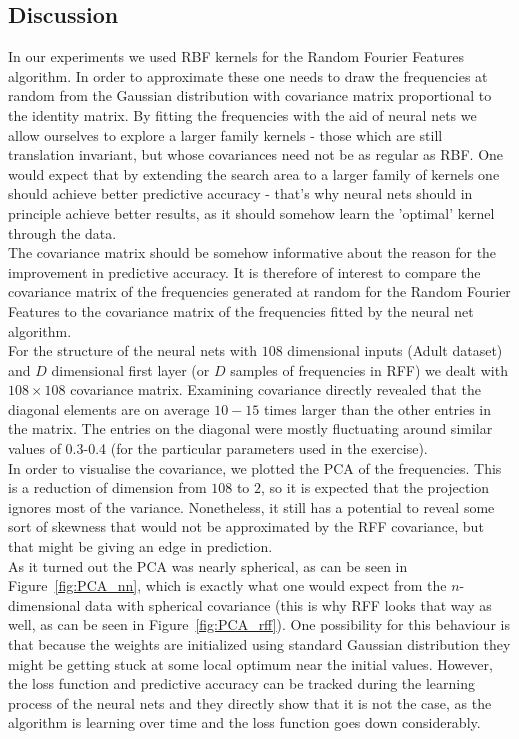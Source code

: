 \documentclass{article} %
\begin{document}
\subsection{Discussion}
In our experiments we used RBF kernels for the Random Fourier Features algorithm. In order to approximate these one needs to draw the frequencies at random from the Gaussian distribution with covariance matrix proportional to the identity matrix. By fitting the frequencies with the aid of neural nets we allow ourselves to explore a larger family kernels - those which are still translation invariant, but whose covariances need not be as regular as RBF. One would expect that by extending the search area to a larger family of kernels one should achieve better predictive accuracy - that's why neural nets should in principle achieve better results, as it should somehow learn the 'optimal' kernel through the data.\\

The covariance matrix should be somehow informative about the reason for the improvement in predictive accuracy. It is therefore of interest to compare the covariance matrix of the frequencies generated at random for the Random Fourier Features to the covariance matrix of the frequencies fitted by the neural net algorithm.\\

For the structure of the neural nets with $108$ dimensional inputs (Adult dataset) and $D$ dimensional first layer (or $D$ samples of frequencies in RFF) we dealt with $108\times 108$ covariance matrix. Examining covariance directly revealed that the diagonal elements are on average $10-15$ times larger than the other entries in the matrix. The entries on the diagonal were mostly fluctuating around similar values of 0.3-0.4 (for the particular parameters used in the exercise).\\

In order to visualise the covariance, we plotted the PCA of the frequencies. This is a reduction of dimension from $108$ to $2$, so it is expected that the projection ignores most of the variance. Nonetheless, it still has a potential to reveal some sort of skewness that would not be approximated by the RFF covariance, but that might be giving an edge in prediction.\\

As it turned out the PCA was nearly spherical, as can be seen in Figure~\ref{fig:PCA_nn}, which is exactly what one would expect from the $n$-dimensional data with spherical covariance (this is why RFF looks that way as well, as can be seen in Figure~\ref{fig:PCA_rff}). One possibility for this behaviour is that because the weights are initialized using standard Gaussian distribution they might be getting stuck at some local optimum near the initial values. However, the loss function and predictive accuracy can be tracked during the learning process of the neural nets and they directly show that it is not the case, as the algorithm is learning over time and the loss function goes down considerably.\\
\end{document}
